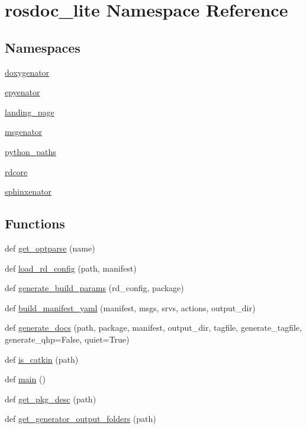 \hypertarget{namespacerosdoc__lite}{}\section{rosdoc\+\_\+lite Namespace Reference}
\label{namespacerosdoc__lite}
\subsection*{Namespaces}
\begin{DoxyCompactItemize}
\item 
 \hyperlink{namespacerosdoc__lite_1_1doxygenator}{doxygenator}
\item 
 \hyperlink{namespacerosdoc__lite_1_1epyenator}{epyenator}
\item 
 \hyperlink{namespacerosdoc__lite_1_1landing__page}{landing\+\_\+page}
\item 
 \hyperlink{namespacerosdoc__lite_1_1msgenator}{msgenator}
\item 
 \hyperlink{namespacerosdoc__lite_1_1python__paths}{python\+\_\+paths}
\item 
 \hyperlink{namespacerosdoc__lite_1_1rdcore}{rdcore}
\item 
 \hyperlink{namespacerosdoc__lite_1_1sphinxenator}{sphinxenator}
\end{DoxyCompactItemize}
\subsection*{Functions}
\begin{DoxyCompactItemize}
\item 
def \hyperlink{namespacerosdoc__lite_a4f69c4f772f803a650eb21293add04fb}{get\+\_\+optparse} (name)
\item 
def \hyperlink{namespacerosdoc__lite_a6fc9bd97d3d23ecd8dcb06dcc5b32f73}{load\+\_\+rd\+\_\+config} (path, manifest)
\item 
def \hyperlink{namespacerosdoc__lite_a7a0d37797437270150ffb62125868be6}{generate\+\_\+build\+\_\+params} (rd\+\_\+config, package)
\item 
def \hyperlink{namespacerosdoc__lite_afe958f791ef5c66777c758593e3151cd}{build\+\_\+manifest\+\_\+yaml} (manifest, msgs, srvs, actions, output\+\_\+dir)
\item 
def \hyperlink{namespacerosdoc__lite_a412f06a0ad22f22a437a925f90722ac5}{generate\+\_\+docs} (path, package, manifest, output\+\_\+dir, tagfile, generate\+\_\+tagfile, generate\+\_\+qhp=False, quiet=True)
\item 
def \hyperlink{namespacerosdoc__lite_a347844d5121ce4dcba0c45b96b81467a}{is\+\_\+catkin} (path)
\item 
def \hyperlink{namespacerosdoc__lite_af17b2a5046f7827add27b1cc8deb06a0}{main} ()
\item 
def \hyperlink{namespacerosdoc__lite_a1bd136953d9747e7e0ac2471b48e9030}{get\+\_\+pkg\+\_\+desc} (path)
\item 
def \hyperlink{namespacerosdoc__lite_a6989fe38bd215d8c83b7d0a1a86aa600}{get\+\_\+generator\+\_\+output\+\_\+folders} (path)
\end{DoxyCompactItemize}
